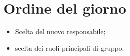 \section{Ordine del giorno}

\begin{itemize}
    \item Scelta del nuovo responsabile;
    \item scelta dei ruoli principali di gruppo.
\end{itemize}
